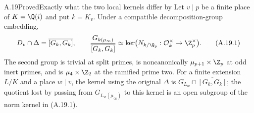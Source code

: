 \begin{statement}{A.19}{Proved}{Exactly what the two local kernels differ by}
Let $v\mid p$ be a finite place of $K=\Q(i)$ and put $k=K_v$.
Under a compatible decomposition-group embedding,
\[
 D_v\cap\Delta=\overline{[G_k,G_k]},\qquad
 \frac{G_{k(\mu_\infty)}}{\overline{[G_k,G_k]}}
 \simeq\ker\bigl(N_{k/\Q_p}:\mathcal O_k^{\times}
                                  \to\Z_p^{\times}\bigr).
                                                               \tag{A.19.1}
\]
The second group is trivial at split primes, is noncanonically
$\mu_{p+1}\times\Z_p$ at odd inert primes, and is
$\mu_4\times\Z_2$ at the ramified prime two.
For a finite extension $L/K$ and a place $w\mid v$, the kernel
using the original $\Delta$ is
$G_{L_w}\cap\overline{[G_k,G_k]}$; the quotient lost by passing
from $G_{L_w(\mu_\infty)}$ to this kernel is an open subgroup
of the norm kernel in (A.19.1).
\end{statement}
